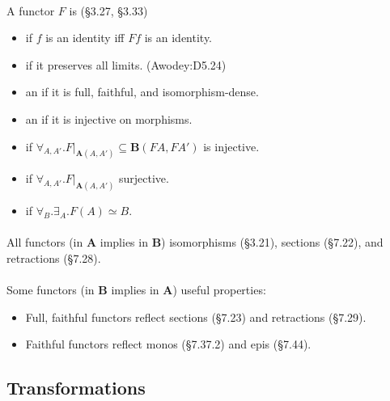 \documentclass[10pt,twocolumn,letterpaper]{article}
\begin{document}
  \paragraph{}
  A functor $F$ is (\S3.27, \S3.33)
  \begin{itemize}
    \item {} if $f$ is an identity iff $Ff$ is an identity.
    \item {} if it preserves all limits. (Awodey:D5.24)
    \item an  if it is full, faithful, and
      isomorphism-dense.
    \item an  if it is injective on morphisms.
    \item {} if $\forall_{A,A'} . F\vert_{\mathbf{A}(A,A')}
      \subseteq \mathbf{B}(FA, FA')$ is injective.
    \item {} if $\forall_{A,A'} . F\vert_{\mathbf{A}(A,A')}$ surjective.
    \item {} if $\forall_B . \exists_A . F(A) \simeq B$.
  \end{itemize}

  \paragraph{}
  All functors  (in $\mathbf{A}$ implies in $\mathbf{B}$) 
  isomorphisms (\S3.21), sections (\S7.22), and retractions (\S7.28).

  \paragraph{}
  Some functors  (in $\mathbf{B}$ implies in $\mathbf{A}$) useful properties:
  \begin{itemize}
      \item Full, faithful functors reflect sections (\S7.23) and retractions (\S7.29).
      \item Faithful functors reflect monos (\S7.37.2) and epis (\S7.44).
  \end{itemize}

\subsection{Transformations} %
\end{document}
